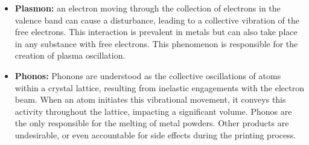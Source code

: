 \begin{itemize}
    \item \textbf{Plasmon:} an electron moving through the collection of electrons in the valence band can cause a disturbance, leading to a collective vibration of the free electrons. This interaction is prevalent in metals but can also take place in any substance with free electrons. This phenomenon is responsible for the creation of plasma oscillation.
    \item \textbf{Phonos:} Phonons are understood as the collective oscillations of atoms within a crystal lattice, resulting from inelastic engagements with the electron beam. When an atom initiates this vibrational movement, it conveys this activity throughout the lattice, impacting a significant volume. Phonos are the only responsible for the melting of metal powders. Other products are undesirable, or even accountable for side effects during the printing process.
\end{itemize}
